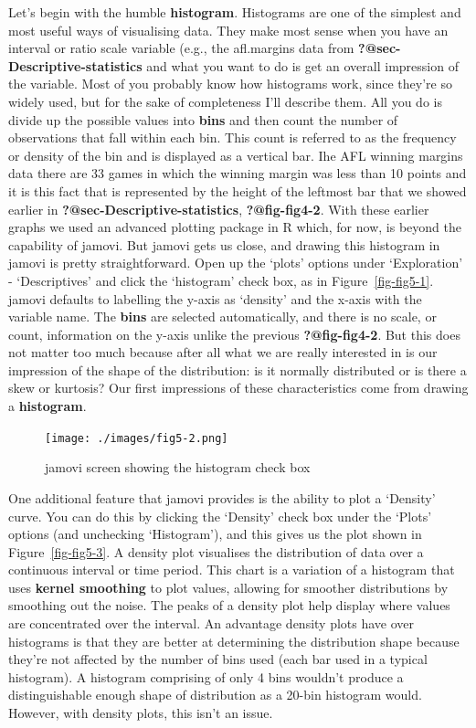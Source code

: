 \documentclass[
  letterpaper,
]{book}
\begin{document}
Let's begin with the humble \textbf{histogram}. Histograms are one of
the simplest and most useful ways of visualising data. They make most
sense when you have an interval or ratio scale variable (e.g., the
afl.margins data from \textbf{?@sec-Descriptive-statistics} and what you
want to do is get an overall impression of the variable. Most of you
probably know how histograms work, since they're so widely used, but for
the sake of completeness I'll describe them. All you do is divide up the
possible values into \textbf{bins} and then count the number of
observations that fall within each bin. This count is referred to as the
frequency or density of the bin and is displayed as a vertical bar. Ihe
AFL winning margins data there are 33 games in which the winning margin
was less than 10 points and it is this fact that is represented by the
height of the leftmost bar that we showed earlier in
\textbf{?@sec-Descriptive-statistics}, \textbf{?@fig-fig4-2}. With these
earlier graphs we used an advanced plotting package in R which, for now,
is beyond the capability of jamovi. But jamovi gets us close, and
drawing this histogram in jamovi is pretty straightforward. Open up the
`plots' options under `Exploration' - `Descriptives' and click the
`histogram' check box, as in Figure~\ref{fig-fig5-1}. jamovi defaults to
labelling the y-axis as `density' and the x-axis with the variable name.
The \textbf{bins} are selected automatically, and there is no scale, or
count, information on the y-axis unlike the previous
\textbf{?@fig-fig4-2}. But this does not matter too much because after
all what we are really interested in is our impression of the shape of
the distribution: is it normally distributed or is there a skew or
kurtosis? Our first impressions of these characteristics come from
drawing a \textbf{histogram}.

\begin{figure}

\texttt{[image: ./images/fig5-2.png]} \hfill{}

\caption{\label{fig-fig5-2}jamovi screen showing the histogram check
box}

\end{figure}

One additional feature that jamovi provides is the ability to plot a
`Density' curve. You can do this by clicking the `Density' check box
under the `Plots' options (and unchecking `Histogram'), and this gives
us the plot shown in Figure~\ref{fig-fig5-3}. A density plot visualises
the distribution of data over a continuous interval or time period. This
chart is a variation of a histogram that uses \textbf{kernel smoothing}
to plot values, allowing for smoother distributions by smoothing out the
noise. The peaks of a density plot help display where values are
concentrated over the interval. An advantage density plots have over
histograms is that they are better at determining the distribution shape
because they're not affected by the number of bins used (each bar used
in a typical histogram). A histogram comprising of only 4 bins wouldn't
produce a distinguishable enough shape of distribution as a 20-bin
histogram would. However, with density plots, this isn't an issue.
\end{document}
